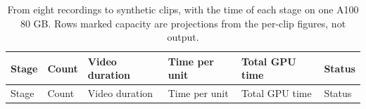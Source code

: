 \documentclass[
  11pt,
]{article}
\begin{document}
\begin{longtable}[]{@{}
  >{\raggedright\arraybackslash}p{}
  >{\raggedright\arraybackslash}p{}
  >{\raggedright\arraybackslash}p{}
  >{\raggedright\arraybackslash}p{}
  >{\raggedright\arraybackslash}p{}
  >{\raggedright\arraybackslash}p{}@{}}
\caption{From eight recordings to synthetic clips, with the time of each
stage on one A100 80 GB. Rows marked capacity are projections from the
per-clip figures, not output.}\tabularnewline
\toprule\noalign{}
\begin{minipage}[b]{\linewidth}\raggedright
Stage
\end{minipage} & \begin{minipage}[b]{\linewidth}\raggedright
Count
\end{minipage} & \begin{minipage}[b]{\linewidth}\raggedright
Video duration
\end{minipage} & \begin{minipage}[b]{\linewidth}\raggedright
Time per unit
\end{minipage} & \begin{minipage}[b]{\linewidth}\raggedright
Total GPU time
\end{minipage} & \begin{minipage}[b]{\linewidth}\raggedright
Status
\end{minipage} \\
\midrule\noalign{}
\endfirsthead
\toprule\noalign{}
\begin{minipage}[b]{\linewidth}\raggedright
Stage
\end{minipage} & \begin{minipage}[b]{\linewidth}\raggedright
Count
\end{minipage} & \begin{minipage}[b]{\linewidth}\raggedright
Video duration
\end{minipage} & \begin{minipage}[b]{\linewidth}\raggedright
Time per unit
\end{minipage} & \begin{minipage}[b]{\linewidth}\raggedright
Total GPU time
\end{minipage} & \begin{minipage}[b]{\linewidth}\raggedright
Status

\end{minipage}
\end{longtable}
\end{document}
